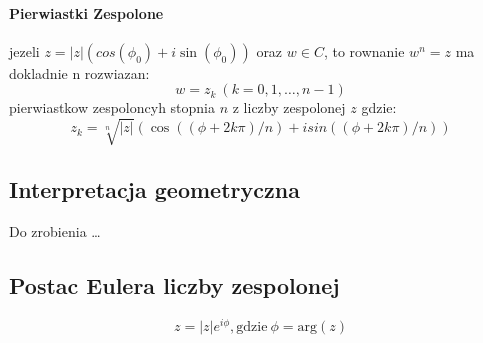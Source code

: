 \documentclass[a4paper]{article}
\begin{document}
\paragraph{Pierwiastki Zespolone}
jezeli $    z = |z|(cos(\phi_0) + i\sin(\phi_0))$ oraz $w \in C$, to rownanie $w^{n} = z$ ma dokladnie n rozwiazan:
\begin{equation}
    w = z_{k} \ (k = 0,1, \ldots , n -1)
\end{equation}
pierwiastkow zespoloncyh stopnia $n$ z liczby zespolonej $z$ gdzie:
\begin{equation}
z_{k} = \sqrt[n]{|z|}(\cos((\phi + 2k\pi)/n)+ i sin((\phi + 2k\pi)/n))
\end{equation}
\subsection{Interpretacja geometryczna}
Do zrobienia \ldots
\subsection{Postac Eulera liczby zespolonej}
\begin{equation}
    z = |z|e^{i\phi}, \text{gdzie} \ \phi = \text{arg}(z)
\end{equation}
\end{document}
